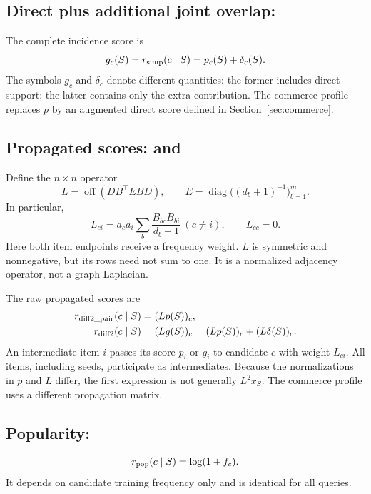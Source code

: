 \documentclass[11pt,a4paper]{article}
\newcommand{\off}{\operatorname{off}}
\DeclareRobustCommand{\key}[1]{\texttt{\detokenize{#1}}}
\begin{document}
\subsection{Direct plus additional joint overlap: \key{simp}}
The complete incidence score is
\begin{equation}
 g_c(S)=r_{\rm simp}(c\mid S)=p_c(S)+\delta_c(S).
\end{equation}
The symbols $g_c$ and $\delta_c$ denote different quantities: the former
includes direct support; the latter contains only the extra contribution.
The commerce profile replaces $p$ by an augmented direct score defined in
Section~\ref{sec:commerce}.

\subsection{Propagated scores: \key{diff2_pair} and \key{diff2}}
Define the $n\times n$ operator
\begin{equation}\label{eq:L}
 L=\off\!\left(DB^\top EBD\right),\qquad
 E=\operatorname{diag}\bigl((d_b+1)^{-1}\bigr)_{b=1}^m.
\end{equation}
In particular,
\[
 L_{ci}=a_ca_i\sum_b\frac{B_{bc}B_{bi}}{d_b+1}\ (c\ne i),\qquad L_{cc}=0.
\]
Here both item endpoints receive a frequency weight. $L$ is symmetric and
nonnegative, but its rows need not sum to one. It is a normalized adjacency
operator, not a graph Laplacian.

The raw propagated scores are
\begin{align}
 r_{\rm diff2\_pair}(c\mid S)&=(Lp(S))_c,
 \\
 r_{\rm diff2}(c\mid S)&=(Lg(S))_c
 =(Lp(S))_c+(L\delta(S))_c.
\end{align}
An intermediate item $i$ passes its score $p_i$ or $g_i$ to candidate $c$
with weight $L_{ci}$. All items, including seeds, participate as intermediates.
Because the normalizations in $p$ and $L$ differ, the first expression is not
generally $L^2x_S$. The commerce profile uses a different propagation matrix.

\subsection{Popularity: \key{pop}}
\begin{equation}
 r_{\rm pop}(c\mid S)=\log(1+f_c).
\end{equation}
It depends on candidate training frequency only and is identical for all queries.
\end{document}
